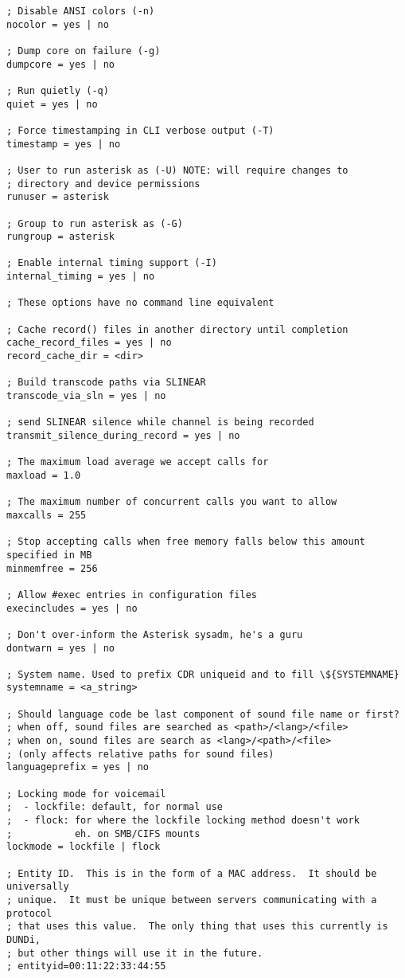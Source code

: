\begin{astlisting}
\begin{verbatim}
; Disable ANSI colors (-n)
nocolor = yes | no

; Dump core on failure (-g)
dumpcore = yes | no

; Run quietly (-q)
quiet = yes | no

; Force timestamping in CLI verbose output (-T)
timestamp = yes | no

; User to run asterisk as (-U) NOTE: will require changes to
; directory and device permissions
runuser = asterisk				

; Group to run asterisk as (-G)
rungroup = asterisk

; Enable internal timing support (-I)
internal_timing = yes | no

; These options have no command line equivalent

; Cache record() files in another directory until completion
cache_record_files = yes | no			
record_cache_dir = <dir>

; Build transcode paths via SLINEAR
transcode_via_sln = yes | no 			

; send SLINEAR silence while channel is being recorded
transmit_silence_during_record = yes | no

; The maximum load average we accept calls for
maxload = 1.0

; The maximum number of concurrent calls you want to allow
maxcalls = 255 

; Stop accepting calls when free memory falls below this amount specified in MB
minmemfree = 256

; Allow #exec entries in configuration files
execincludes = yes | no

; Don't over-inform the Asterisk sysadm, he's a guru
dontwarn = yes | no

; System name. Used to prefix CDR uniqueid and to fill \${SYSTEMNAME}
systemname = <a_string>

; Should language code be last component of sound file name or first?
; when off, sound files are searched as <path>/<lang>/<file>
; when on, sound files are search as <lang>/<path>/<file>
; (only affects relative paths for sound files)
languageprefix = yes | no			

; Locking mode for voicemail
;  - lockfile: default, for normal use
;  - flock: for where the lockfile locking method doesn't work
;           eh. on SMB/CIFS mounts
lockmode = lockfile | flock
  
; Entity ID.  This is in the form of a MAC address.  It should be universally
; unique.  It must be unique between servers communicating with a protocol
; that uses this value.  The only thing that uses this currently is DUNDi,
; but other things will use it in the future.
; entityid=00:11:22:33:44:55


\end{verbatim}
\end{astlisting}
